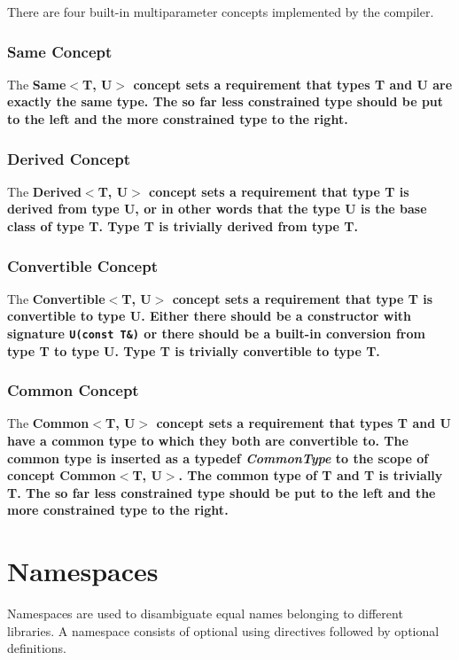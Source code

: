\documentclass[a4paper,oneside,11pt]{article}
\begin{document}
There are four built-in multiparameter concepts implemented by the compiler.

\subsubsection{Same Concept}

The \bf{Same$<$T, U$>$} concept sets a requirement that types T and U are exactly the same type.
The so far less constrained type should be put to the left and the more constrained type to the right.

\subsubsection{Derived Concept}

The \bf{Derived$<$T, U$>$} concept sets a requirement that type T is derived from type U, or in other words that the type U is the base class of type T. Type T is trivially derived from type T.

\subsubsection{Convertible Concept}

The \bf{Convertible$<$T, U$>$} concept sets a requirement that type T is convertible to type U.
Either there should be a constructor with signature \verb|U(const T&)| or there should be a built-in conversion
from type T to type U. Type T is trivially convertible to type T.

\subsubsection{Common Concept}

The \bf{Common$<$T, U$>$} concept sets a requirement that types T and U have a common type to which they both are convertible to. The common type is inserted as a typedef \emph{CommonType} to the scope of concept \bf{Common$<$T, U$>$}. The common type of T and T is trivially T.
The so far less constrained type should be put to the left and the more constrained type to the right.

\section{Namespaces}

Namespaces are used to disambiguate equal names belonging to different libraries.
A namespace consists of optional using directives followed by optional definitions.
\end{document}
